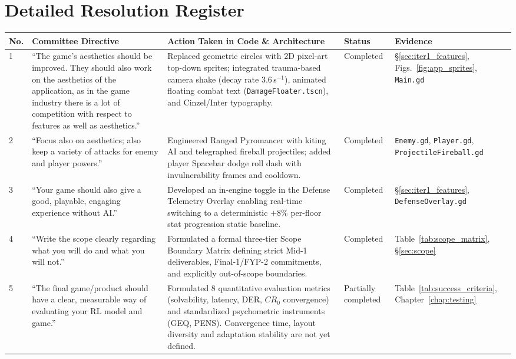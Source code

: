 \section*{Detailed Resolution Register}
\begin{longtable}{p{}p{}p{}p{}p{}}
\toprule
\textbf{No.} & \textbf{Committee Directive} & \textbf{Action Taken in Code \& Architecture} & \textbf{Status} & \textbf{Evidence} \\
\midrule
1 & ``The game's aesthetics should be improved. They should also work on the aesthetics of the application, as in the game industry there is a lot of competition with respect to features as well as aesthetics.'' & Replaced geometric circles with 2D pixel-art top-down sprites; integrated trauma-based camera shake (decay rate $3.6$\,s$^{-1}$), animated floating combat text (\texttt{DamageFloater.tscn}), and Cinzel/Inter typography. & Completed & §\ref{sec:iter1_features}, Figs.~\ref{fig:app_sprites}, \texttt{Main.gd} \\
\midrule
2 & ``Focus also on aesthetics; also keep a variety of attacks for enemy and player powers.'' & Engineered Ranged Pyromancer with kiting AI and telegraphed fireball projectiles; added player Spacebar dodge roll dash with invulnerability frames and cooldown. & Completed & \texttt{Enemy.gd}, \texttt{Player.gd}, \texttt{ProjectileFireball.gd} \\
\midrule
3 & ``Your game should also give a good, playable, engaging experience without AI.'' & Developed an in-engine toggle in the Defense Telemetry Overlay enabling real-time switching to a deterministic $+8\%$ per-floor stat progression static baseline. & Completed & §\ref{sec:iter1_features}, \texttt{DefenseOverlay.gd} \\
\midrule
4 & ``Write the scope clearly regarding what you will do and what you will not.'' & Formulated a formal three-tier Scope Boundary Matrix defining strict Mid-1 deliverables, Final-1/FYP-2 commitments, and explicitly out-of-scope boundaries. & Completed & Table~\ref{tab:scope_matrix}, §\ref{sec:scope} \\
\midrule
5 & ``The final game/product should have a clear, measurable way of evaluating your RL model and game.'' & Formulated 8 quantitative evaluation metrics (solvability, latency, DER, $CR_0$ convergence) and standardized psychometric instruments (GEQ, PENS). Convergence time, layout diversity and adaptation stability are not yet defined. & Partially completed & Table~\ref{tab:success_criteria}, Chapter~\ref{chap:testing} \\

\end{longtable}
